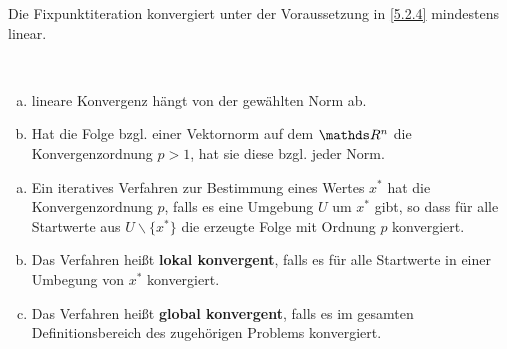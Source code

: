 \begin{Beme}
	Die Fixpunktiteration konvergiert unter der Voraussetzung in \ref{5.2.4} mindestens linear.
\end{Beme}


\begin{Beme}~
	\begin{enumerate}[a)]
		\item  lineare Konvergenz hängt von der gewählten Norm ab.
		\item Hat die Folge bzgl. einer Vektornorm auf dem $\R^n$ die Konvergenzordnung $p>1$,
		hat sie diese bzgl. jeder Norm.
	\end{enumerate}
\end{Beme}


\begin{Defe}
	\label{5.3.4}
	\begin{enumerate}[a)]
		\item Ein iteratives Verfahren zur Bestimmung eines Wertes $x^{*}$ hat 
		die Konvergenzordnung $p$, falls es eine Umgebung $U$ um $x^{*}$ gibt, 
		so dass für alle Startwerte aus $U\backslash \{x^{*}\}$ die erzeugte Folge mit Ordnung $p$ konvergiert.
		\item Das Verfahren heißt \textbf{lokal konvergent},
		falls es für alle Startwerte in einer Umbegung von $x^{*}$ konvergiert.
		\item Das Verfahren heißt \textbf{global konvergent},
		falls es im gesamten Definitionsbereich des zugehörigen Problems konvergiert.
	\end{enumerate}
\end{Defe} 


